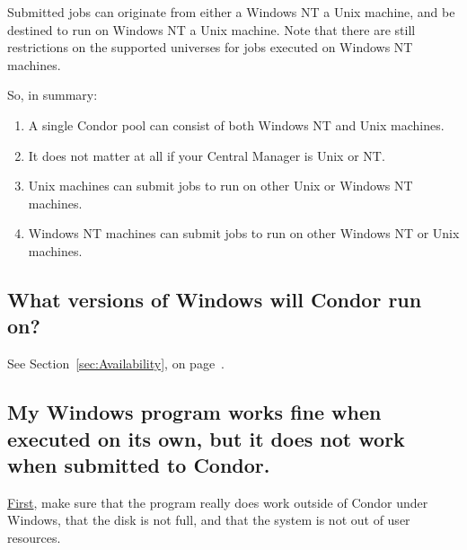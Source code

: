 Submitted jobs can originate from either a 
Windows NT  a Unix machine,
and be destined to run on Windows NT 
 a Unix machine.
Note that there are still restrictions on the supported universes
for jobs executed on Windows NT machines.

So, in summary:

\begin{enumerate}

\item{A single Condor pool can consist of both Windows NT and Unix
machines.}

\item{It does not matter at all if your Central Manager is Unix or NT.}

\item{Unix machines can submit jobs to run on other Unix or Windows NT
machines.}

\item{Windows NT machines can submit jobs to run on other Windows
NT or Unix machines.}

\end{enumerate}


\subsection*{What versions of Windows will Condor run on?}

See Section~\ref{sec:Availability}, on
page~\pageref{sec:Availability}.


\subsection*{My Windows program works fine when executed on its own, but it
does not work when submitted to Condor.}

\underline{First}, make sure that the program really does work
outside of Condor under Windows,
that the disk is not full,
and that the system is not out of user resources.

